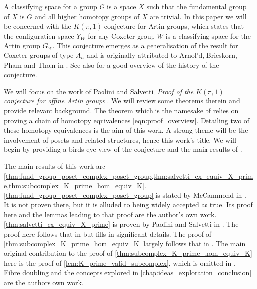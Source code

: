 \documentclass[class=guthesis, crop=false]{standalone}
\begin{document}
A classifying space for a group $G$ is a space $X$ such that the fundamental group of $X$ is $G$ and all higher homotopy groups of $X$ are trivial.
In this paper we will be concerned with the $K(\pi,1)$ conjecture for Artin groups, which states that the configuration space $Y_W$ for any Coxeter group $W$ is a classifying space for the Artin group $G_W$.  This conjecture emerges as a generalisation of the result for Coxeter groups of type $A_n$ and is originally attributed to Arnol'd, Brieskorn, Pham and Thom in \cite{paris_kpi1_2014}. See also \cite{charney_davis_pi_1995} for a good overview of the history of the conjecture.

We will focus on the work of Paolini and Salvetti, \emph{Proof of the $K(\pi, 1)$ conjecture for affine Artin groups} \cite{paolini_salvetti_kpi1_2021}. We will review some theorems therein and provide relevant background. The theorem which is the namesake of \cite{paolini_salvetti_kpi1_2021} relies on proving a chain of homotopy equivalences \eqref{eqn:proof_overview}. Detailing two of these homotopy equivalences is the aim of this work. A strong theme will be the involvement of posets and related structures, hence this work's title. We will begin by providing a birds eye view of the conjecture and the  main results of \cite{paolini_salvetti_kpi1_2021}.

The main results of this work are \cref{thm:fund_group_poset_complex_poset_group,thm:salvetti_cx_equiv_X_prime,thm:subcomplex_K_prime_hom_equiv_K}.
\cref{thm:fund_group_poset_complex_poset_group} is stated by McCammond in \cite{mccammond_introduction_2005}. It is not proven there, but it is alluded to being widely accepted as true. Its proof here and the lemmas leading to that proof are the author's own work.
\cref{thm:salvetti_cx_equiv_X_prime} is proven by Paolini and Salvetti in \cite{paolini_salvetti_kpi1_2021}. The proof here follows that in \cite{paolini_salvetti_kpi1_2021} but fills in significant details.
The proof of \cref{thm:subcomplex_K_prime_hom_equiv_K} largely follows that in \cite{paolini_salvetti_kpi1_2021}. The main original contribution to the proof of \cref{thm:subcomplex_K_prime_hom_equiv_K} here is the proof of \cref{lem:K_prime_valid_subcomplex}, which is omitted in \cite{paolini_salvetti_kpi1_2021}.
Fibre doubling and the concepts explored in \cref{chap:ideas_exploration_conclusion} are the authors own work.
\end{document}
